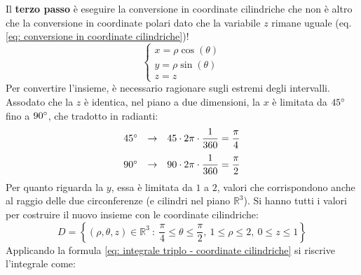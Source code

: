 \documentclass[a4paper]{article}
\begin{document}
	Il \textbf{terzo passo} è eseguire la conversione in coordinate cilindriche che non è altro che la conversione in coordinate polari dato che la variabile $z$ rimane uguale (eq. \ref{eq: conversione in coordinate cilindriche})!
	\begin{equation*}
		\begin{cases}
			x = \rho\cos\left(\theta\right) \\
			y = \rho\sin\left(\theta\right) \\
			z = z
		\end{cases}
	\end{equation*}
	Per convertire l'insieme, è necessario ragionare sugli estremi degli intervalli. Assodato che la $z$ è identica, nel piano a due dimensioni, la $x$ è limitata da $45\degree$ fino a $90\degree$, che tradotto in radianti:
	\begin{equation*}
		\begin{array}{rcl}
			45\degree &\rightarrow& 45 \cdot 2\pi \cdot \dfrac{1}{360} = \dfrac{\pi}{4} \\ [1em]
			90\degree &\rightarrow& 90 \cdot 2\pi \cdot \dfrac{1}{360} = \dfrac{\pi}{2} 
		\end{array}
	\end{equation*}
	Per quanto riguarda la $y$, essa è limitata da $1$ a $2$, valori che corrispondono anche al raggio delle due circonferenze (e cilindri nel piano $\mathbb{R}^{3}$). Si hanno tutti i valori per costruire il nuovo insieme con le coordinate cilindriche:
	\begin{equation*}
		D = \left\{\left(\rho,\theta,z\right) \in \mathbb{R}^{3} \: : \: \dfrac{\pi}{4} \le \theta \le \dfrac{\pi}{2},\: 1 \le \rho \le 2,\: 0 \le z \le 1\right\}
	\end{equation*}
	Applicando la formula \ref{eq: integrale triplo - coordinate cilindriche} si riscrive l'integrale come:
\end{document}
